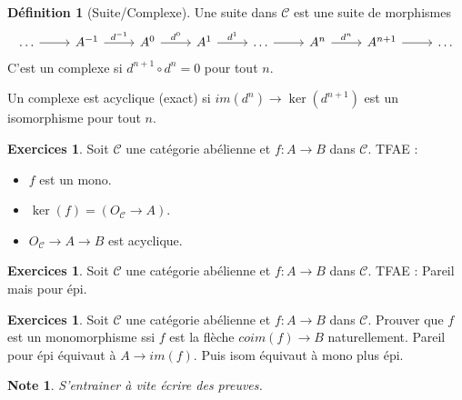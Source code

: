 \documentclass[a4paper,12pt]{book}
\newcommand{\Cat}{\mathcal{C}}
\theoremstyle{plain}
\newtheorem{note}{Note}
\theoremstyle{definition}
\newtheorem{defn}[subsection]{Définition}
\newtheorem{exo}[subsection]{Exercices}
\theoremstyle{remark}
\begin{document}
\begin{defn}[Suite/Complexe]
    Une suite dans $\Cat$ est une suite de morphismes
\[\begin{tikzcd}
	\ldots & {A^{-1}} & {A^0} & {A^1} & \ldots & {A^n} & {A^{n+1}} & \ldots
	\arrow[from=1-1, to=1-2]
	\arrow["{d^{-1}}", from=1-2, to=1-3]
	\arrow["{d^0}", from=1-3, to=1-4]
	\arrow["{d^1}", from=1-4, to=1-5]
	\arrow[from=1-5, to=1-6]
	\arrow["{d^n}", from=1-6, to=1-7]
	\arrow[from=1-7, to=1-8]
\end{tikzcd}\]
    C'est un complexe si $d^{n+1}\circ d^n=0$ pour tout $n$.

    Un complexe est acyclique (exact) si $im(d^n)\to \ker(d^{n+1})$
    est un isomorphisme pour tout $n$.
\end{defn}
\begin{exo}
    Soit $\Cat$ une catégorie abélienne et $f\colon A\to B$
    dans $\Cat$. TFAE : 
    \begin{itemize}
	\item $f$ est un mono.
	\item $\ker(f)=(O_{\Cat}\to A)$.
	\item $O_{\Cat}\to A\to B$ est acyclique.
    \end{itemize}
\end{exo}
\begin{exo}
    Soit $\Cat$ une catégorie abélienne et $f\colon A\to B$
    dans $\Cat$. TFAE : Pareil mais pour épi.
\end{exo}
\begin{exo}
    Soit $\Cat$ une catégorie abélienne et $f\colon A\to B$
    dans $\Cat$. Prouver que $f$ est un monomorphisme ssi
    $f$ est la flèche $coim(f)\to B$ naturellement. Pareil pour 
    épi équivaut à $A\to im(f)$. Puis isom équivaut à mono plus épi.
\end{exo}

\begin{note}
    S'entrainer à vite écrire des preuves.
\end{note}
 
\end{document}
